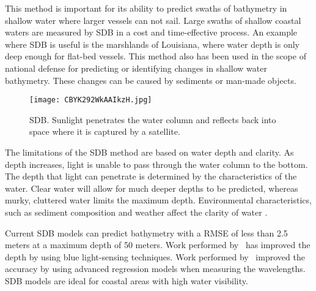 \par
This method is important for its ability to predict swaths of bathymetry in shallow water where larger vessels can not sail.
Large swaths of shallow coastal waters are measured by \ac{SDB} in a cost and time-effective process.
An example where \ac{SDB} is useful is the marshlands of Louisiana, where water depth is only deep enough for flat-bed vessels.
This method also has been used in the scope of national defense for predicting or identifying changes in shallow water bathymetry.
These changes can be caused by sediments or man-made objects. \\

\begin{figure}[htp]
    \centering
    \texttt{[image: CBYK292WkAAIkzH.jpg]}
    \caption[Figure depicting Satellite-Derived Bathymetry]{\ac{SDB}.
    Sunlight penetrates the water column and reflects back into space where it is captured by a satellite.}
    \label{fig:sdb}
\end{figure} 

\medskip


\par
The limitations of the \ac{SDB} method are based on water depth and clarity.
As depth increases, light is unable to pass through the water column to the bottom.
The depth that light can penetrate is determined by the characteristics of the water.
Clear water will allow for much deeper depths to be predicted, whereas murky, cluttered water limits the maximum depth.
Environmental characteristics, such as sediment composition and weather affect the clarity of water \cite{vinayaraj2016satellite}.

\par
Current \ac{SDB} models can predict bathymetry with a \ac{RMSE} of less than 2.5 meters at a maximum depth of 50 meters.
Work performed by~\cite{vinayaraj2016satellite} has improved the depth by using blue light-sensing techniques.
Work performed by~\cite{chybicki2018three} improved the accuracy by using advanced regression models when measuring the wavelengths.
\ac{SDB} models are ideal for coastal areas with high water visibility.

